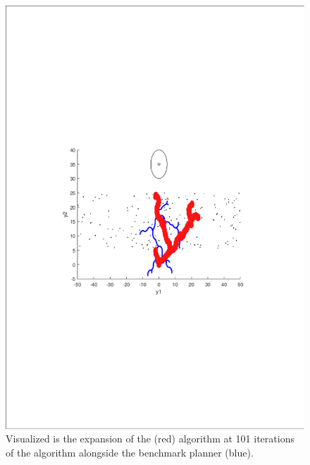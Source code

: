 \begin{figure}[!t]
  \centering
  \begin{minipage}[c]{.9\columnwidth}
  \includegraphics[scale=.5, trim={5cm, 9cm, 5cm, 7cm}, clip]{figures/experiments/rrtfunnel-101samples-dyn-merged.pdf}
  \caption[The expansion of the \rrtfunnel{} algorithm at 1, and 101
  iterations]{Visualized is the expansion of the \rrtfunnel{} (red) algorithm at 101
    iterations of the algorithm alongside the benchmark planner (blue).}
  \end{minipage}
\end{figure}

